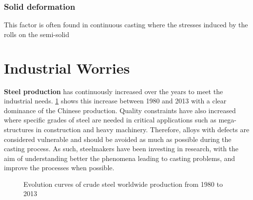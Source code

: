 \subsubsection{Solid deformation} 
This factor is often found in continuous casting where the stresses induced by the rolls on the semi-solid

\section{Industrial Worries}
\textbf{Steel production} has continuously increased over the years to meet the industrial needs. \cref{fig:steel_production} shows this increase between 1980 and 2013 with a 
clear dominance of the Chinese production. Quality constraints have also increased where specific grades of steel are needed in critical applications such as mega-structures
in construction and  heavy machinery. Therefore, alloys with defects are considered vulnerable and should be avoided as much as possible during the casting process. As such, steelmakers have been investing
in research, with the aim of understanding better the phenomena leading to casting problems, and improve the processes when possible.

\begin{figure}[!h]
\centering
{}
\caption{Evolution curves of crude steel worldwide production from 1980 to 2013}
\label{fig:steel_production}
\end{figure}

